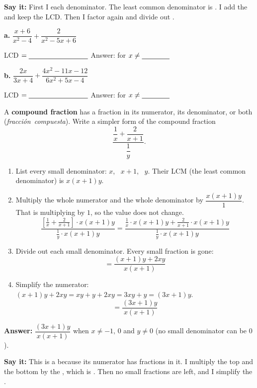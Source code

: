 \textbf{Say it:} First I \blank[2cm] each denominator. The least common denominator is \blank[3.6cm]. I add the \blank[2.4cm] and keep the LCD. Then I factor again and divide out \blank[1.4cm].

\begin{minipage}[t]{0.48\textwidth}
\textbf{a.} $\dfrac{x+6}{x^2-4}+\dfrac{2}{x^2-5x+6}$

\vspace{4pt}
LCD $=\blank[3cm]$
\lines[3]
Answer: \blank[2.6cm] for $x\neq\blank[1.4cm]$
\end{minipage}\hfill
\begin{minipage}[t]{0.48\textwidth}
\textbf{b.} $\dfrac{2x}{3x+4}+\dfrac{4x^2-11x-12}{6x^2+5x-4}$

\vspace{4pt}
LCD $=\blank[3cm]$
\lines[3]
Answer: \blank[2.6cm] for $x\neq\blank[1.4cm]$
\end{minipage}

\newpage

A \textbf{compound fraction} has a fraction in its numerator, its denominator, or both (\mbox{\emph{fracci\'on compuesta}}). Write a simpler form of the compound fraction
\[\dfrac{\dfrac{1}{x}+\dfrac{2}{x+1}}{\dfrac{1}{y}}.\]

\begin{enumerate}[label=\textbf{\arabic*.}, itemsep=3pt]
\item List every small denominator: $x$, \ $x+1$, \ $y$. Their LCM (the least common denominator) is $x(x+1)y$.
\item Multiply the whole numerator and the whole denominator by $\dfrac{x(x+1)y}{1}$. That is multiplying by $1$, so the value does not change.
\[
\frac{\left[\frac{1}{x}+\frac{2}{x+1}\right]\cdot x(x+1)y}{\frac{1}{y}\cdot x(x+1)y}
=\frac{\frac{1}{x}\cdot x(x+1)y+\frac{2}{x+1}\cdot x(x+1)y}{\frac{1}{y}\cdot x(x+1)y}
\]
\item Divide out each small denominator. Every small fraction is gone:
\[
=\frac{(x+1)y+2xy}{x(x+1)}
\]
\item Simplify the numerator: $(x+1)y+2xy=xy+y+2xy=3xy+y=(3x+1)y$.
\[
=\frac{(3x+1)y}{x(x+1)}
\]
\end{enumerate}
\textbf{Answer:} $\dfrac{(3x+1)y}{x(x+1)}$ when $x\neq-1,\,0$ and $y\neq0$ (no small denominator can be $0$).

\textbf{Say it:} This is a \blank[3.4cm] because its numerator has fractions in it. I multiply the top and the bottom by the \blank[4.6cm], which is \blank[2.6cm]. Then no small fractions are left, and I simplify the \blank[2.4cm].

